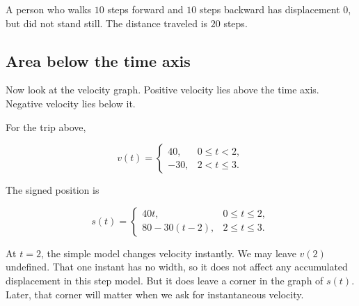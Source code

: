 A person who walks \(10\) steps forward and \(10\) steps backward has displacement \(0\), but did not stand still. The distance traveled is \(20\) steps.

\subsection{Area below the time axis}

Now look at the velocity graph. Positive velocity lies above the time axis. Negative velocity lies below it.

For the trip above,

\[
v(t)=
\begin{cases}
40, & 0\leq t<2,\\
-30, & 2<t\leq 3.
\end{cases}
\]

The signed position is

\[
s(t)=
\begin{cases}
40t, & 0\leq t\leq 2,\\
80-30(t-2), & 2\leq t\leq 3.
\end{cases}
\]

At \(t=2\), the simple model changes velocity instantly. We may leave \(v(2)\) undefined. That one instant has no width, so it does not affect any accumulated displacement in this step model. But it does leave a corner in the graph of \(s(t)\). Later, that corner will matter when we ask for instantaneous velocity.

